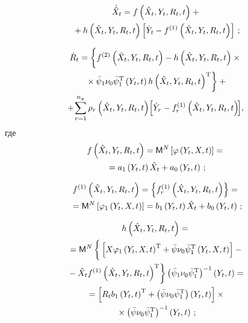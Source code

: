 \begin{multicols}{2}
\noindent
\begin{multline}
\dot{\hat X}_t = f \left(\hat X_t, Y_t,R_t,t\right)+{}\\
{}+
    h\left(\hat X_t,Y_t, R_t,t\right)\left[ \dot Y_t - f^{(1)} \left(\hat X_t,Y_t,
    R_t,t\right)\right]\,;\label{e3.4-s2}
    \end{multline}
    
\vspace*{-12pt}

    \noindent
\begin{multline}
\dot R_t=\left\{ 
\vphantom{\left({\hat X}_t, Y_t,R_t,t\right)^{\mathrm{T}}}
f^{(2)}\left(\hat X_t, Y_t,R_t,t\right)-h\left(\hat
    X_t, Y_t,R_t,t\right)\times{}\right.\\
\left.{}{}\times\bar \psi_1\nu_0\bar \psi_1^{\mathrm{T}} 
    \left(Y_t,t\right)  
    h \left({\hat X}_t, Y_t,R_t,t\right)^{\mathrm{T}}\right\} +{}\\
   \hspace*{-3.6mm} {}+\!
\sss_{r=1}^{n_y} \rho_r \left({\hat X}_t,Y_t, R_t,t\right)\!\lk
    \dot Y_r -f_r^{(1)}\left({\hat X}_t,Y_t, R_t,t\right) \!\rk\!,\!\!\!\!
    \label{e3.5-s2}
    \end{multline}
где
   \begin{multline*}
    f\left(\hat X_t, Y_t,R_t,t\right)= {\sf M}^N\left[ \varphi \left(Y_t, X,t\right)\right]= {}\\
    {}=
    a_1 \left(Y_t, t\right) \hat X_t + a_0 \left(Y_t, t\right)\,;
  \end{multline*}
    
    
    \vspace*{-12pt}
    
    \noindent
    \begin{multline*}
    f^{(1)}\left(\hat X_t, Y_t,R_t,t\right)=\left\{ f_r^{(1)} 
    \left( \hat X_t, Y_t, R_t, t\right)\right\}={}\\
    {}=
    {\sf M}^N\left[ \varphi_1\left(Y_t, X,t\right)\right]=b_1 \left(Y_t, t\right) \hat X_t+ 
    b_0 \left(Y_t, t\right)\,;
    \end{multline*}
    
    \vspace*{-12pt}
    
    \noindent
    \begin{multline*}
h\left(\hat X_t, Y_t,R_t,t\right)={}\\
{}=\mm^N \left\{
\vphantom{\hat X_t f^{(1)}\left(\hat X_t, Y_t,R_t,t\right)^{\mathrm{T}}}
\left[ X\varphi_1\left(
Y_t,X,t\right)^{\mathrm{T}} + \bar \psi\nu_0\bar \psi_1^{\mathrm{T}} 
\left(Y_t,X,t\right)\right]-{}\right.\\
\left.{}-
    \hat X_t f^{(1)}\left(\hat X_t, Y_t,R_t,t\right)^{\mathrm{T}}\right\}
\left(\bar \psi_1\nu_0\bar \psi_1^{\mathrm{T}}\right)^{-1} \left(Y_t,t\right)= {}\\
{}=
\lk R_t b_1 \left(Y_t, t\right)^{\mathrm{T}} + 
\left(\bar \psi\nu_0\bar \psi_1^{\mathrm{T}}\right)\left(Y_t, t\right)
\rk \times{}\\
{}\times\left(\bar \psi\nu_0\bar \psi_1^{\mathrm{T}}\right)^{-1} \left(Y_t, t\right)\,;
\end{multline*}


\end{multicols}
